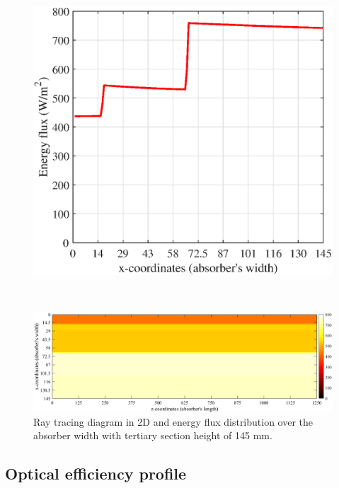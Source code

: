 \begin{figure}[ht!]
\begin{minipage}{0.48\columnwidth}
	\end{minipage}
	\begin{minipage}{0.48\columnwidth}
		\includegraphics[scale=0.48]{figs/Energy2D-hts145.eps}
	\end{minipage}
	\\[3mm]
	\begin{minipage}{1.0\columnwidth}
		\includegraphics[scale=0.41]{figs/Energy3D-hts145.png}
	\end{minipage}
	
	\caption{Ray tracing diagram in 2D and energy flux distribution over the absorber width with tertiary section height of 145 mm.}
	\label{Tertiary-hts145}
\end{figure}

\subsection{Optical efficiency profile}

